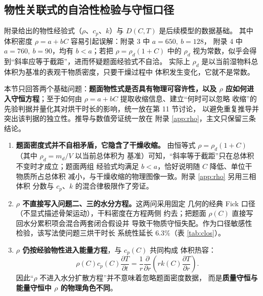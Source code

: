 \documentclass[12pt,a4paper,fontset=none]{ctexart}
\begin{document}
\subsection{物性关联式的自洽性检验与守恒口径}
\label{sec:rho}
\label{sec:closure}

附录给出的物性经验式（$\rho$、$c_p$、$k$）与 $D(C,T)$ 是后续模型的数据基础。
其中体积密度 $\rho=a+bC$ 容易引起误解：附录 3 中 $a=650,\ b=128$，
附录 4 中 $a=760,\ b=90$，均有 $b<a$；若把 $\rho=\rho_d(1+C)$ 中的
$\rho_d$ 视为常数，似乎会得到``斜率应等于截距''，进而怀疑题面经验式不自洽。
实际上 $\rho_d$ 是以当前湿物料总体积为基准的表观干物质密度，只要干燥过程中
体积发生变化，它就不是常数。

本节只回答两个基础问题：\textbf{题面物性式是否具有物理可容许性，以及 $\rho$
应如何进入守恒方程}；至于如何由 $\rho=a+bC$ 提取收缩信息、建立``何时可以忽略
收缩''的先验判据并量化其对烘干时长的影响，统一放在第 11 节讨论，
以避免重复推导并突出该判据的独立性。推导与数值旁证统一放在
附录 \ref{app:rho}，主文只保留三条结论。

\begin{enumerate}
  \item \textbf{题面密度式并不自相矛盾，它隐含了干燥收缩。}
        由恒等式 $\rho=\rho_d(1+C)$（其中 $\rho_d=m_d/V$ 以当前总体积为
        基准）可知，``斜率等于截距''只在总体积不变时才成立；题面两组
        经验式均满足 $b<a$，恰好说明随 $C$ 降低、单位干物质所占总体积
        减小，与干燥收缩的物理图像一致。附录 \ref{app:rho} 另用三相体积
        分数与 $c_p$、$k$ 的混合律极限作了旁证。
  \item \textbf{$\rho$ 不直接写入问题二、三的水分方程。}这两问采用固定
        几何的经典 Fick 口径（不显式描述骨架运动），干料密度在方程两侧
        约去；把题面 $\rho(C)$ 直接写回水分累积项会混合两套闭合假设并
        导致干物质守恒失配。作为口径敏感性检验，该写法使问题三烘干时长
        系统性延长 $6.3\%$（表 \ref{tab:clos}）。
  \item \textbf{$\rho$ 仍按经验物性进入能量方程}，与 $c_p(C)$ 共同构成
        体积热容：
        \begin{equation}
          \rho(C)c_p(C)\frac{\partial T}{\partial t}
          =\frac{1}{r}\frac{\partial}{\partial r}
          \left(rk(C)\frac{\partial T}{\partial r}\right).
          \label{eq:energy-rho}
        \end{equation}
        因此``$\rho$ 不进入水分扩散方程''并不意味着忽略题面密度数据，
        而是\textbf{质量守恒与能量守恒中 $\rho$ 的物理角色不同}。
\end{enumerate}
\end{document}
